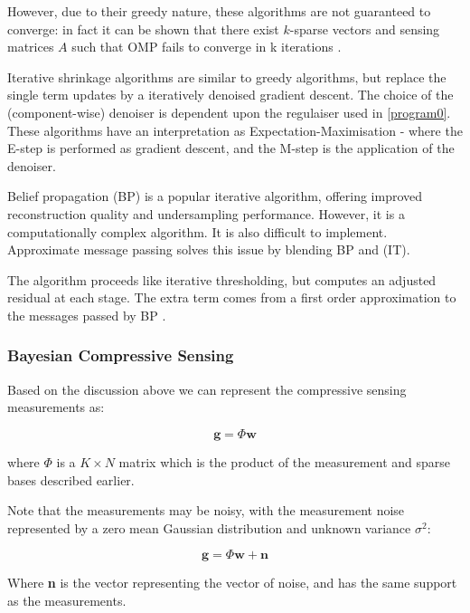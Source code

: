 However, due to their greedy nature, these algorithms are not guaranteed to converge: in fact it can be shown that there exist \(k\)-sparse vectors and sensing matrices \(A\) such that OMP fails to converge in k iterations \cite{wen2013improved}.

Iterative shrinkage algorithms are similar to greedy algorithms, but replace the single term updates by a iteratively denoised gradient descent. The choice of the (component-wise) denoiser is dependent upon the regulaiser used in \ref{program0}. These algorithms have an interpretation as Expectation-Maximisation \cite{figueiredo2003algorithm} - where the E-step is performed as gradient descent, and the M-step is the application of the denoiser.

Belief propagation (BP) \cite{Yedidia2011} is a popular iterative algorithm, offering improved reconstruction quality and undersampling performance. However, it is a computationally complex algorithm. It is also difficult to implement. Approximate message passing solves this issue by blending BP and (IT).

The algorithm proceeds like iterative thresholding, but computes an adjusted residual at each stage. The extra term comes from a first order approximation to the messages passed by BP \cite{metzler2014denoising}.

\subsubsection{Bayesian Compressive Sensing}
\label{sec:BayesianCS}
Based on the discussion above we can represent the compressive sensing measurements as: 

\begin{equation}
\textbf{g} = \Phi	\textbf{w}
\end{equation}

where \(\Phi\) is a \(K \times	N\) matrix which is the product of the measurement and sparse bases described earlier.

Note that the measurements may be noisy, with the measurement noise represented by a zero mean Gaussian distribution and unknown variance \( \sigma^2 \):

\begin{equation}
\textbf{g} = \Phi \textbf{w} + \textbf{n}
\end{equation}
\label{CSequation}

Where \textbf{n} is the vector representing the vector of noise, and has the same support as the measurements. 

